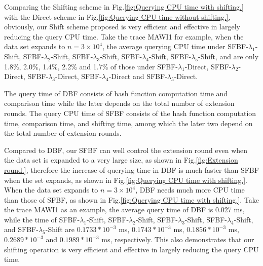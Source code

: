 \documentclass[10pt,journal,letterpaper]{IEEEtran}
\newcommand{\note}[1]{{\sffamily\itshape\bfseries\uline{#1}}}
\begin{document}

 Comparing the Shifting scheme in Fig.\ref{fig:Querying CPU time with shifting.}  with the Direct scheme in Fig.\ref{fig:Querying CPU time without shifting.}, obviously, our Shift scheme proposed is very efficient and effective in largely reducing the query CPU time. Take the trace MAWI1 for example, when the data set expands to $n = 3 \times 10^4$, the average querying CPU time under SFBF-$\lambda_1$-Shift, SFBF-$\lambda_2$-Shift, SFBF-$\lambda_3$-Shift, SFBF-$\lambda_4$-Shift, SFBF-$\lambda_5$-Shift, and are only 1.8\%, 2.0\%, 1.4\%, 2.2\% and 1.7\% of those under SFBF-$\lambda_1$-Direct, SFBF-$\lambda_2$-Direct, SFBF-$\lambda_3$-Direct, SFBF-$\lambda_4$-Direct and SFBF-$\lambda_5$-Direct.

The query time of DBF consists of hash function computation time and comparison time while the later depends on the total number of extension rounds. The query CPU time of SFBF consists of the hash function computation time, comparison time, and shifting time, among which the later two depend on the total number of extension rounds.

 Compared to DBF, our SFBF can well control the extension round even when the data set is expanded to a very large size, as shown in Fig.\ref{fig:Extension round.}, therefore the increase of querying time in DBF is much faster than SFBF when the set expands, as shown in Fig.\ref{fig:Querying CPU time with shifting.}. When the data set expands to $n = 3 \times 10^4$, DBF needs much more CPU time than those of SFBF, as shown in Fig.\ref{fig:Querying CPU time with shifting.}. Take the trace MAWI1 as an example, the average query time of DBF is 0.027 ms, while the time of SFBF-$\lambda_1$-Shift, SFBF-$\lambda_2$-Shift, SFBF-$\lambda_3$-Shift, SFBF-$\lambda_4$-Shift, and SFBF-$\lambda_5$-Shift are $0.1733*10^{-3}$ ms, $0.1743*10^{-3}$ ms, $0.1856*10^{-3}$ ms, $0.2689*10^{-3}$ and $0.1989*10^{-3}$ ms, respectively. This also   demonstrates that our shifting operation is  very
efficient and effective in largely reducing the query CPU time.
\end{document}
